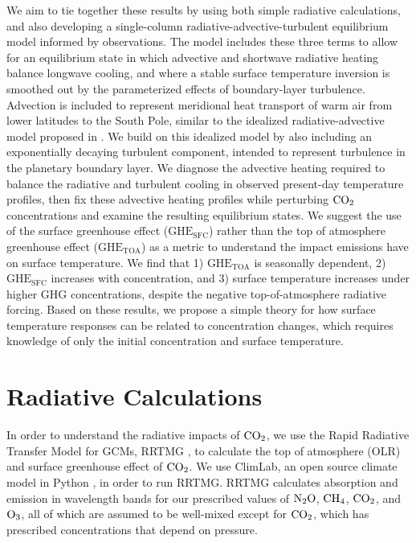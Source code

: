 \documentclass[draft]{agujournal2019}
\begin{document}
We aim to tie together these results by using both simple radiative calculations, and also developing a single-column radiative-advective-turbulent equilibrium model informed by observations. The model includes these three terms to allow for an equilibrium state in which advective and shortwave radiative heating balance longwave cooling, and where a stable surface temperature inversion is smoothed out by the parameterized effects of boundary-layer turbulence. Advection is included to represent meridional heat transport of warm air from lower latitudes to the South Pole, similar to the idealized radiative-advective model proposed in . We build on this idealized model by also including an exponentially decaying turbulent component, intended to represent turbulence in the planetary boundary layer. We diagnose the advective heating required to balance the radiative and turbulent cooling in observed present-day temperature profiles, then fix these advective heating profiles while perturbing $\ce{CO_2}$ concentrations and examine the resulting equilibrium states. We suggest the use of the surface greenhouse effect ($\text{GHE}_\text{{SFC}}$) rather than the top of atmosphere greenhouse effect ($\text{GHE}_\text{{TOA}}$) as a metric to understand the impact  emissions have on surface temperature. We find that 1) $\text{GHE}_\text{{TOA}}$ is seasonally dependent, 2) $\text{GHE}_{\text{SFC}}$ increases with  concentration, and 3) surface temperature increases under higher GHG concentrations, despite the negative top-of-atmosphere radiative forcing. Based on these results, we propose a simple theory for how surface temperature responses can be related to  concentration changes, which requires knowledge of only the initial  concentration and surface temperature.

\section{Radiative Calculations}

In order to understand the radiative impacts of $\ce{CO_2}$, we use the Rapid Radiative Transfer Model for GCMs, RRTMG \cite{mlawer_radiative_1997}, to calculate the top of atmosphere (OLR) and surface greenhouse effect of $\ce{CO_2}$. We use ClimLab, an open source climate model in Python \cite{rose_climlab_2018}, in order to run RRTMG. RRTMG calculates absorption and emission in wavelength bands for our prescribed values of $\ce{N_2O}$, $\ce{CH_4}$, $\ce{CO_2}$, and $\ce{O_3}$, all of which are assumed to be well-mixed except for $\ce{CO_2}$, which has prescribed concentrations that depend on pressure. 
\end{document}
